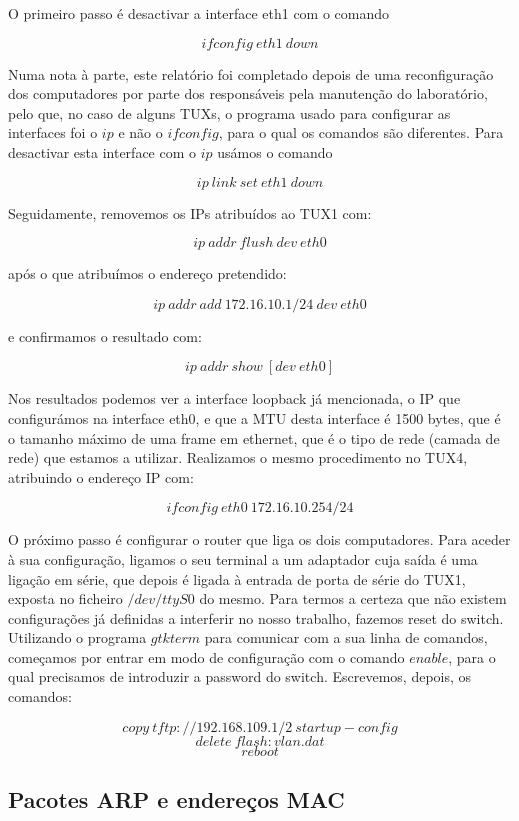 \documentclass[a4paper,11pt,titlepage]{article}
\begin{document}
O primeiro passo é desactivar a interface eth1 com o comando

$$ifconfig\ eth1\ down$$

Numa nota à parte, este relatório foi completado depois de uma
reconfiguração dos computadores por parte dos responsáveis pela manutenção do
laboratório, pelo que, no caso de alguns TUXs, o programa usado para configurar
as interfaces foi o $ip$ e não o $ifconfig$, para o qual os comandos são
diferentes. Para desactivar esta interface com o $ip$ usámos o comando

$$ip\ link\ set\ eth1\ down$$

Seguidamente, removemos os IPs atribuídos ao TUX1 com:

$$ip\ addr\ flush\ dev\ eth0$$

após o que atribuímos o endereço pretendido:

$$ip\ addr\ add\ 172.16.10.1/24\ dev\ eth0$$

e confirmamos o resultado com:

$$ip\ addr\ show\ [dev\ eth0]$$

Nos resultados podemos ver a interface loopback já mencionada, o IP que
configurámos na interface eth0, e que a MTU desta interface é 1500 bytes, que é
o tamanho máximo de uma frame em ethernet, que é o tipo de rede (camada de
rede) que estamos a utilizar.
Realizamos o mesmo procedimento no TUX4, atribuindo o endereço IP com:

$$ifconfig\ eth0\ 172.16.10.254/24$$

O próximo passo é configurar o router que liga os dois computadores.  Para
aceder à sua configuração, ligamos o seu terminal a um adaptador cuja saída é
uma ligação em série, que depois é ligada à entrada de porta de série do TUX1,
exposta no ficheiro $/dev/ttyS0$ do mesmo.
Para termos a certeza que não existem configurações já definidas a interferir no nosso trabalho, fazemos reset do switch. Utilizando o programa $gtkterm$ para
comunicar com a sua linha de comandos, começamos por entrar em modo de
configuração com o comando $enable$, para o qual precisamos de introduzir a
password do switch. Escrevemos, depois, os comandos:

$$copy\ tftp://192.168.109.1/2\ startup-config$$
$$delete\ flash:vlan.dat$$
$$reboot$$



\subsection{Pacotes ARP e endereços MAC}
\end{document}
